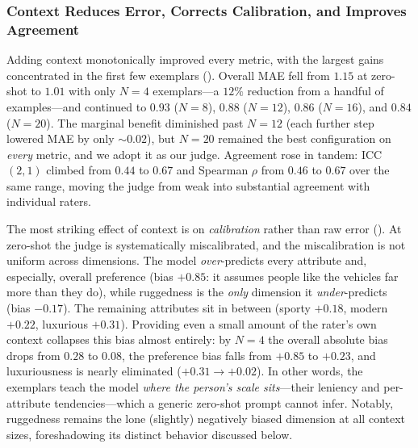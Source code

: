 \subsubsection{Context Reduces Error, Corrects Calibration, and Improves Agreement}
\label{sec:res-contextsweep}
Adding context monotonically improved every metric, with the largest gains
concentrated in the first few exemplars ().
Overall MAE fell from $1.15$ at zero-shot to $1.01$ with only $N{=}4$ exemplars---a
$12\%$ reduction from a handful of examples---and continued to $0.93$ ($N{=}8$),
$0.88$ ($N{=}12$), $0.86$ ($N{=}16$), and $0.84$ ($N{=}20$). The marginal benefit
diminished past $N{=}12$ (each further step lowered MAE by only ${\sim}0.02$), but
$N{=}20$ remained the best configuration on \emph{every} metric, and we adopt it as
our judge. Agreement rose in tandem: ICC$(2,1)$ climbed from $0.44$ to $0.67$ and
Spearman $\rho$ from $0.46$ to $0.67$ over the same range, moving the judge from
weak into substantial agreement with individual raters.

The most striking effect of context is on \emph{calibration} rather than raw error
(). At zero-shot the judge is systematically
miscalibrated, and the miscalibration is not uniform across dimensions. The model
\emph{over}-predicts every attribute and, especially, overall preference
(bias $+0.85$: it assumes people like the vehicles far more than they do), while
ruggedness is the \emph{only} dimension it \emph{under}-predicts (bias $-0.17$).
The remaining attributes sit in between (sporty $+0.18$, modern $+0.22$,
luxurious $+0.31$). Providing even a small amount of the rater's own context
collapses this bias almost entirely: by $N{=}4$ the overall absolute bias drops from
$0.28$ to $0.08$, the preference bias falls from $+0.85$ to $+0.23$, and
luxuriousness is nearly eliminated ($+0.31 \rightarrow +0.02$). In other words, the
exemplars teach the model \emph{where the person's scale sits}---their leniency and
per-attribute tendencies---which a generic zero-shot prompt cannot infer. Notably,
ruggedness remains the lone (slightly) negatively biased dimension at all context
sizes, foreshadowing its distinct behavior discussed below.

